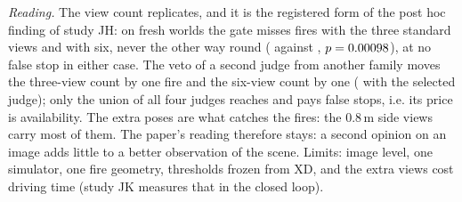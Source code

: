 \emph{Reading.} The view count replicates, and it is the registered form of the post hoc finding of study JH: on fresh worlds the gate misses \JIThree{} fires with the three standard views and \JISix{} with six, never the other way round (\JIOnlyThree{} against \JIOnlySix{}, $p=0.00098$), at no false stop in either case. The veto of a second judge from another family moves the three-view count by one fire and the six-view count by one (\JIVetoMiss{} with the selected judge); only the union of all four judges reaches \JIAllMiss{} and pays \JIAllFS{} false stops, i.e. its price is availability. The extra poses are what catches the fires: the 0.8\,m side views carry most of them. The paper's reading therefore stays: a second opinion on an image adds little to a better observation of the scene. Limits: image level, one simulator, one fire geometry, thresholds frozen from XD, and the extra views cost driving time (study JK measures that in the closed loop).

